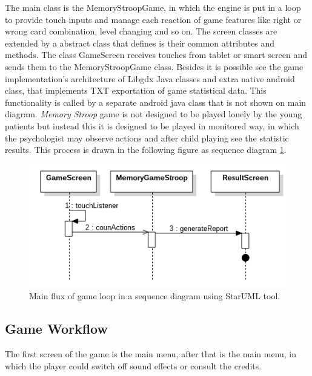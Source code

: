 The main class is the MemoryStroopGame, in which the engine is put in a loop to provide touch inputs and manage each reaction of game features like right or wrong card combination, level changing and so on. The screen classes are extended by a abstract class that defines is their common attributes and methods. The class GameScreen receives touches from tablet or smart screen and sends them to the MemoryStroopGame class. Besides it is possible see the game implementation's architecture of Libgdx Java classes and extra native android class, that implements TXT exportation of game statistical data. This functionality is called by a separate android java class that is not shown on main diagram. \textit{Memory Stroop} game is not designed to be played lonely by the young patients but instead this it is designed to be played in monitored way, in which the psychologist may observe actions and after child playing see the statistic results. This process is drawn in the following figure as sequence diagram \ref{sequence}.
		
						\begin{figure}[htp]
							\begin{center}
								\includegraphics[scale=0.65]{chapters/desenvolvimento/img/sequence.png}
								\caption{Main flux of game loop in a sequence diagram using StarUML tool.}
								\label{sequence}
							\end{center}
						\end{figure}

\subsection{Game Workflow}

The first screen of the game is the main menu, after that is the main menu, in which the player could switch off sound effects or consult the credits.

